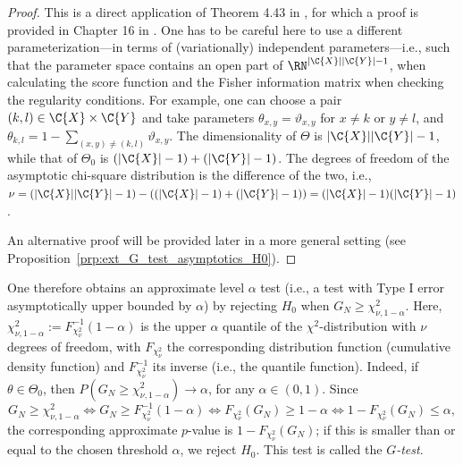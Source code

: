 \begin{proof}
This is a direct application of Theorem 4.43 in \cite{Bijma++2017}, for which a proof is
provided in Chapter 16 in \cite{Vandervaart1998}.
One has to be careful here to use a different parameterization---in
terms of (variationally) independent parameters---i.e.,
such that the parameter space contains an open part of $\RN^{|\C{X}||\C{Y}|-1}$,
when calculating the score function and the Fisher information matrix
when checking the regularity conditions.
For example, one can choose a pair $(k,l) \in \C{X} \times \C{Y}$ and take
parameters $\theta_{x,y} = \vartheta_{x,y}$ for $x \ne k$ or $y \ne l$, and
$\theta_{k,l} = 1 - \sum_{(x,y) \ne (k,l)} \vartheta_{x,y}$. 
The dimensionality of $\Theta$ is $|\C{X}||\C{Y}| - 1$, while
that of $\Theta_0$ is $(|\C{X}|-1) + (|\C{Y}|-1)$. The degrees
of freedom of the asymptotic chi-square distribution is the difference of the two, i.e.,
$\nu = (|\C{X}||\C{Y}|-1)   -   ((|\C{X}|-1) + (|\C{Y}|-1)) = (|\C{X}| - 1)(|\C{Y}| - 1)$.

An alternative proof will be provided later in a more general setting (see Proposition~\ref{prp:ext_G_test_asymptotics_H0}).
\end{proof}

One therefore obtains an approximate level $\alpha$ test (i.e., a test with Type I error asymptotically upper bounded by $\alpha$) 
by rejecting $H_0$ when $G_N \ge \chi_{\nu,1-\alpha}^2$. Here,
$\chi^2_{\nu,1-\alpha} := F_{\chi^2_\nu}^{-1}(1-\alpha)$ is the upper $\alpha$ quantile of the $\chi^2$-distribution with $\nu$ degrees of freedom, with $F_{\chi^2_\nu}$ the corresponding distribution function (cumulative density function) and $F^{-1}_{\chi^2_\nu}$ its inverse (i.e., the quantile function).
Indeed, if $\theta \in \Theta_0$, then $P(G_N \ge \chi_{\nu,1-\alpha}^2) \to \alpha$, for any $\alpha \in (0,1)$.
Since 
$$G_N \ge \chi_{\nu,1-\alpha}^2 \iff G_N \ge F_{\chi^2_\nu}^{-1}(1-\alpha) \iff F_{\chi^2_\nu}(G_N) \ge 1-\alpha \iff 1-F_{\chi^2_\nu}(G_N) \le \alpha,$$
the corresponding approximate $p$-value is $1 - F_{\chi^2_\nu}(G_N)$; if this is smaller than or equal to the chosen threshold $\alpha$, 
we reject $H_0$.
This test is called the \emph{$G$-test}.

